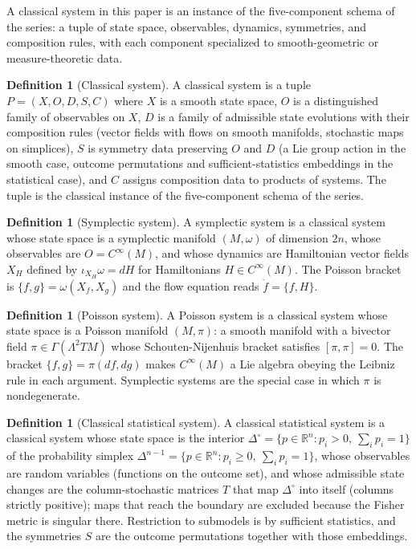 \documentclass[11pt,letterpaper]{article}
\theoremstyle{definition}
\newtheorem{definition}[theorem]{Definition}
\theoremstyle{remark}
\begin{document}
A classical system in this paper is an instance of the five-component schema of the series: a tuple of state space, observables, dynamics, symmetries, and composition rules, with each component specialized to smooth-geometric or measure-theoretic data.

\begin{definition}[Classical system]
\label{def:classical-system}
A classical system is a tuple $P = (X, O, D, S, C)$ where $X$ is a smooth state space, $O$ is a distinguished family of observables on $X$, $D$ is a family of admissible state evolutions with their composition rules (vector fields with flows on smooth manifolds, stochastic maps on simplices), $S$ is symmetry data preserving $O$ and $D$ (a Lie group action in the smooth case, outcome permutations and sufficient-statistics embeddings in the statistical case), and $C$ assigns composition data to products of systems. The tuple is the classical instance of the five-component schema of the series.
\end{definition}

\begin{definition}[Symplectic system]
\label{def:symplectic-system}
A symplectic system is a classical system whose state space is a symplectic manifold $(M, \omega)$ of dimension $2n$, whose observables are $O = C^{\infty}(M)$, and whose dynamics are Hamiltonian vector fields $X_H$ defined by $\iota_{X_H} \omega = dH$ for Hamiltonians $H \in C^{\infty}(M)$. The Poisson bracket is $\{f, g\} = \omega(X_f, X_g)$ and the flow equation reads $\dot{f} = \{f, H\}$.
\end{definition}

\begin{definition}[Poisson system]
\label{def:poisson-system}
A Poisson system is a classical system whose state space is a Poisson manifold $(M, \pi)$: a smooth manifold with a bivector field $\pi \in \Gamma(\Lambda^2 TM)$ whose Schouten-Nijenhuis bracket satisfies $[\pi, \pi] = 0$. The bracket $\{f, g\} = \pi(df, dg)$ makes $C^{\infty}(M)$ a Lie algebra obeying the Leibniz rule in each argument. Symplectic systems are the special case in which $\pi$ is nondegenerate.
\end{definition}

\begin{definition}[Classical statistical system]
\label{def:statistical-system}
A classical statistical system is a classical system whose state space is the interior $\Delta^{\circ} = \{ p \in \mathbb{R}^{n} : p_i > 0,\ \sum_i p_i = 1 \}$ of the probability simplex $\Delta^{n-1} = \{ p \in \mathbb{R}^{n} : p_i \geq 0,\ \sum_i p_i = 1 \}$, whose observables are random variables (functions on the outcome set), and whose admissible state changes are the column-stochastic matrices $T$ that map $\Delta^{\circ}$ into itself (columns strictly positive); maps that reach the boundary are excluded because the Fisher metric is singular there. Restriction to submodels is by sufficient statistics, and the symmetries $S$ are the outcome permutations together with those embeddings.
\end{definition}
\end{document}
